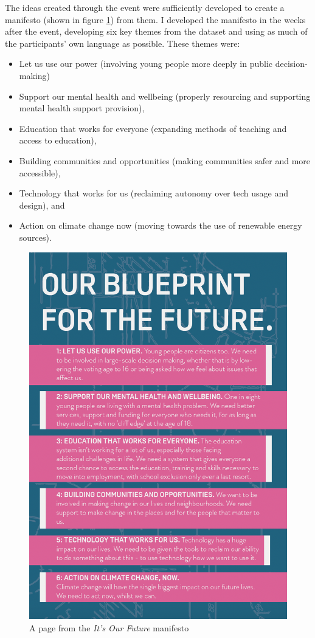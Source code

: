 The ideas created through the event were sufficiently developed to create a manifesto (shown in figure \ref{fig:iof-manifesto}) from them. I developed the manifesto in the weeks after the event, developing six key themes from the dataset and using as much of the participants' own language as possible. These themes were:
\begin{itemize}
    \item Let us use our power (involving young people more deeply in public decision-making)
    \item Support our mental health and wellbeing (properly resourcing and supporting mental health support provision),
    \item Education that works for everyone (expanding methods of teaching and access to education),
    \item Building communities and opportunities (making communities safer and more accessible),
    \item Technology that works for us (reclaiming autonomy over tech usage and design), and
    \item Action on climate change now (moving towards the use of renewable energy sources).
    \end{itemize}
\begin{figure}
    \centering
    \includegraphics[width=1\linewidth]{Images/7/iof-manifesto.png}
    \caption{A page from the \textit{It's Our Future} manifesto}
    \label{fig:iof-manifesto}
\end{figure}
